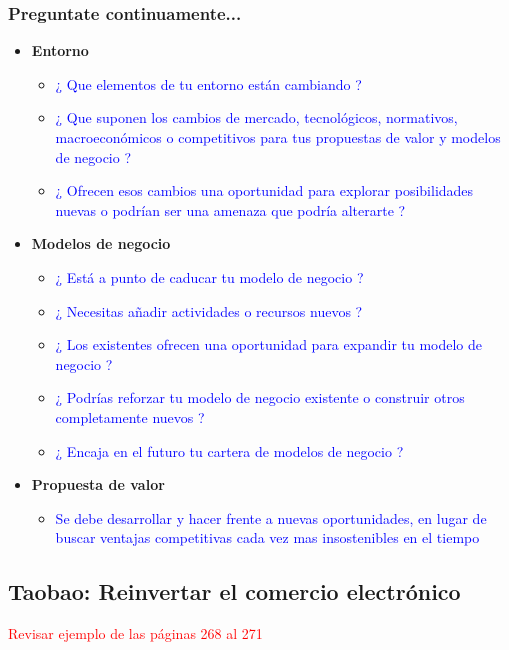 \documentclass[11pt]{book}
\begin{document}
\subsubsection{Preguntate continuamente...}
\begin{itemize}
\item \textbf{ Entorno}\\
\begin{itemize}
\item \textcolor{blue}{¿ Que elementos de tu entorno están cambiando ?}
\item \textcolor{blue}{¿ Que suponen los cambios de mercado, tecnológicos, normativos, macroeconómicos o competitivos para tus propuestas de valor y modelos de negocio ?}
\item \textcolor{blue}{¿ Ofrecen esos cambios una oportunidad para explorar posibilidades nuevas o podrían ser una amenaza que podría alterarte ?}
\end{itemize}
\item \textbf{ Modelos de negocio }\\
\begin{itemize}
\item \textcolor{blue}{¿ Está a punto de caducar tu modelo de negocio ?}
\item \textcolor{blue}{¿ Necesitas añadir actividades o recursos nuevos ?}
\item \textcolor{blue}{¿ Los existentes ofrecen una oportunidad para expandir tu modelo de negocio ?}
\item \textcolor{blue}{¿ Podrías reforzar tu modelo de negocio existente o construir otros completamente nuevos ?}
\item \textcolor{blue}{¿ Encaja en el futuro tu cartera de modelos de negocio ?}
\end{itemize}
\item \textbf{ Propuesta de valor }\\
\begin{itemize}
\item \textcolor{blue}{Se debe desarrollar y hacer frente a nuevas oportunidades, en lugar de buscar ventajas competitivas cada vez mas insostenibles en el tiempo}
\end{itemize}
\end{itemize}
\subsection{Taobao: Reinvertar el comercio electrónico}
\textcolor{red}{Revisar ejemplo de las páginas 268 al 271}
\end{document}
